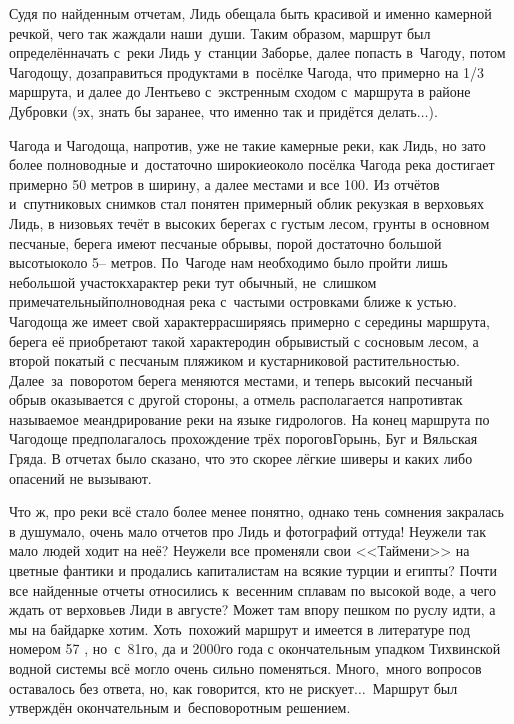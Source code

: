 Судя по найденным отчетам, Лидь обещала быть красивой и именно камерной речкой, чего так жаждали наши~души. Таким образом, маршрут был определён\mdash начать с~реки Лидь у~станции Заборье, далее попасть в~Чагоду, потом Чагодощу, дозаправиться продуктами в~посёлке Чагода, что примерно на 1/3 маршрута, и далее до Лентьево с~экстренным сходом с~маршрута в районе Дубровки (эх, знать бы заранее, что именно так и придётся делать$\ldots$).
 
Чагода и Чагодоща, напротив, уже не такие камерные реки, как Лидь, но зато более полноводные и~достаточно широкие\mdash около посёлка Чагода река достигает примерно 50 метров в ширину, а далее местами и все 100. Из отчётов и~спутниковых снимков стал понятен примерный облик рек\mdash узкая в верховьях Лидь, в низовьях течёт в высоких берегах с густым лесом, грунты в основном песчаные, берега имеют песчаные обрывы, порой достаточно большой высоты\mdash около 5\thinspace-- метров. По~Чагоде нам необходимо было пройти лишь небольшой участок\mdash характер реки тут обычный, не~слишком примечательный\mdash полноводная река с~частыми островками ближе к устью. Чагодоща же имеет свой характер\mdash расширяясь примерно с середины маршрута, берега её приобретают такой характер\mdash один обрывистый с сосновым лесом, а второй покатый с песчаным пляжиком и кустарниковой растительностью. Далее~за~поворотом берега меняются местами, и теперь высокий песчаный обрыв оказывается с другой стороны, а отмель располагается напротив\mdash так называемое меандрирование реки на языке гидрологов. На конец маршрута по Чагодоще предполагалось прохождение трёх порогов\mdash Горынь, Буг и Вяльская Гряда. В отчетах было сказано, что это скорее лёгкие шиверы и каких либо опасений не вызывают. 

Что ж, про реки всё стало более менее понятно, однако тень сомнения закралась в душу\mdash мало, очень мало отчетов про Лидь и фотографий оттуда! Неужели так мало людей ходит на неё? Неужели все променяли свои <<Таймени>> на цветные фантики и продались капиталистам на всякие турции и египты? Почти все найденные отчеты относились к~весенним сплавам по высокой воде, а чего ждать от верховьев Лиди в августе? Может там впору пешком по руслу идти, а мы на байдарке хотим. Хоть~похожий маршрут и имеется в литературе под номером 57 \cite{Рыжавский1,Рыжавский2}, но~с~81\sdash го, да и 2000\sdash го года с окончательным упадком Тихвинской водной системы всё могло очень сильно поменяться. Много,~много вопросов оставалось без ответа, но, как говорится, кто не рискует$\ldots$~Маршрут был утверждён окончательным и~бесповоротным решением.

